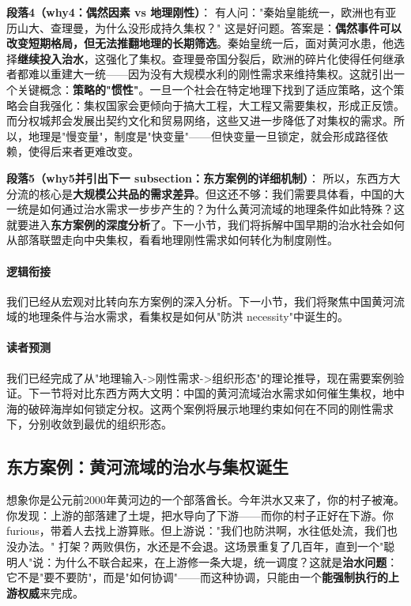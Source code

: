 \documentclass[../main.tex]{subfiles}
\begin{document}
	\textbf{段落4（why4：偶然因素 vs 地理刚性）}：  
	有人问："秦始皇能统一，欧洲也有亚历山大、查理曼，为什么没形成持久集权？" 这是好问题。答案是：\textbf{偶然事件可以改变短期格局，但无法推翻地理的长期筛选}。秦始皇统一后，面对黄河水患，他选择\textbf{继续投入治水}，这强化了集权。查理曼帝国分裂后，欧洲的碎片化使得任何继承者都难以重建大一统——因为没有大规模水利的刚性需求来维持集权。这就引出一个关键概念：\textbf{策略的"惯性"}。一旦一个社会在特定地理下找到了适应策略，这个策略会自我强化：集权国家会更倾向于搞大工程，大工程又需要集权，形成正反馈。而分权城邦会发展出契约文化和贸易网络，这些又进一步降低了对集权的需求。所以，地理是"慢变量"，制度是"快变量"——但快变量一旦锁定，就会形成路径依赖，使得后来者更难改变。
	
	\textbf{段落5（why5并引出下一 subsection：东方案例的详细机制）}：  
	所以，东西方大分流的核心是\textbf{大规模公共品的需求差异}。但这还不够：我们需要具体看，中国的大一统是如何通过治水需求一步步产生的？为什么黄河流域的地理条件如此特殊？这就要进入\textbf{东方案例的深度分析}了。下一小节，我们将拆解中国早期的治水社会如何从部落联盟走向中央集权，看看地理刚性需求如何转化为制度刚性。
	
	\paragraph*{逻辑衔接}
	我们已经从宏观对比转向东方案例的深入分析。下一小节，我们将聚焦中国黄河流域的地理条件与治水需求，看集权是如何从"防洪 necessity"中诞生的。
	
	\paragraph*{读者预测}
	我们已经完成了从"地理输入->刚性需求->组织形态"的理论推导，现在需要案例验证。下一节将对比东西方两大文明：中国的黄河流域治水需求如何催生集权，地中海的破碎海岸如何锁定分权。这两个案例将展示地理约束如何在不同的刚性需求下，分别收敛到最优的组织形态。

	\subsection{东方案例：黄河流域的治水与集权诞生}
	
	\begin{motivation}
		想象你是公元前2000年黄河边的一个部落酋长。今年洪水又来了，你的村子被淹。你发现：上游的部落建了土堤，把水导向了下游——而你的村子正好在下游。你 furious，带着人去找上游算账。但上游说："我们也防洪啊，水往低处流，我们也没办法。" 打架？两败俱伤，水还是不会退。这场景重复了几百年，直到一个"聪明人"说：为什么不联合起来，在上游修一条大堤，统一调度？这就是\textbf{治水问题}：它不是"要不要防"，而是"如何协调"——而这种协调，只能由一个\textbf{能强制执行的上游权威}来完成。
	\end{motivation}
	
\end{document}
